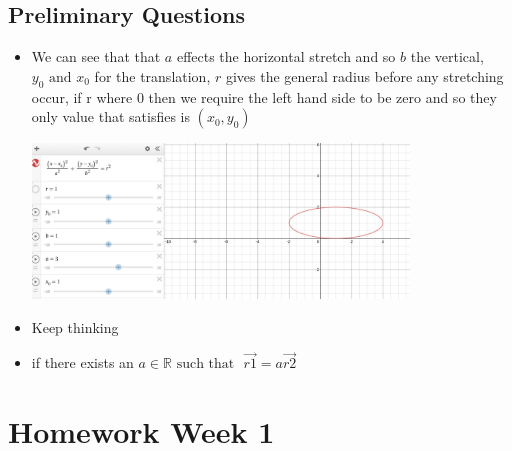 \documentclass[11pt]{book}
\begin{document}
\section{Preliminary Questions}%
\label{sec:preliminary_questions}

\begin{itemize}
    \item We can see that that $a$ effects the horizontal stretch and so $b$ the vertical, $y_{0} \text{ and } x_{0} $ for the translation, $r$ gives the general radius before any stretching occur, if r where $0$ then we require the left hand side to be zero and so they only value that satisfies is $\left( x_0, y_0 \right) $ 
        \begin{center}
            \includegraphics[width=100mm]{assets/probs-circ.png} 
        \end{center}
    \item Keep thinking
    \item if there exists an $a \in \mathbb{R} \text{ such that } $ $\vec{r1} = a \vec{r2} $ 
\end{itemize}



\chapter{Homework Week 1}%
\label{chp:homework_week_1}
\end{document}
